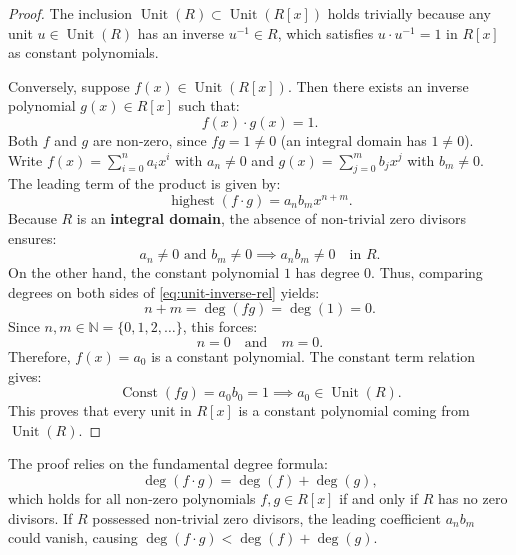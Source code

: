 \begin{content}

\begin{proof}
The inclusion $\operatorname{Unit}(R) \subset \operatorname{Unit}(R[x])$ holds trivially because any unit $u \in \operatorname{Unit}(R)$ has an inverse $u^{-1} \in R$, which satisfies $u \cdot u^{-1} = 1$ in $R[x]$ as constant polynomials.

Conversely, suppose $f(x) \in \operatorname{Unit}(R[x])$. Then there exists an inverse polynomial $g(x) \in R[x]$ such that:
\begin{equation}\label{eq:unit-inverse-rel}
f(x) \cdot g(x) = 1.
\end{equation}
Both $f$ and $g$ are non-zero, since $f g = 1 \neq 0$ (an integral domain has $1 \neq 0$). Write $f(x) = \sum_{i=0}^n a_i x^i$ with $a_n \neq 0$ and $g(x) = \sum_{j=0}^m b_j x^j$ with $b_m \neq 0$.
The leading term of the product is given by:
\[
\operatorname{highest}(f \cdot g) = a_n b_m x^{n+m}.
\]
Because $R$ is an \textbf{integral domain}, the absence of non-trivial zero divisors ensures:
\[
a_n \neq 0 \text{ and } b_m \neq 0 \implies a_n b_m \neq 0 \quad \text{in } R.
\]
On the other hand, the constant polynomial $1$ has degree $0$. Thus, comparing degrees on both sides of \eqref{eq:unit-inverse-rel} yields:
\[
n + m = \deg(fg) = \deg(1) = 0.
\]
Since $n, m \in \mathbb{N} = \{0, 1, 2, \dots\}$, this forces:
\[
n = 0 \quad \text{and} \quad m = 0.
\]
Therefore, $f(x) = a_0$ is a constant polynomial. The constant term relation gives:
\[
\operatorname{Const}(fg) = a_0 b_0 = 1 \implies a_0 \in \operatorname{Unit}(R).
\]
This proves that every unit in $R[x]$ is a constant polynomial coming from $\operatorname{Unit}(R)$.
\end{proof}

\begin{steps}
The proof relies on the fundamental degree formula:
\[
\deg(f \cdot g) = \deg(f) + \deg(g),
\]
which holds for all non-zero polynomials $f, g \in R[x]$ if and only if $R$ has no zero divisors. If $R$ possessed non-trivial zero divisors, the leading coefficient $a_n b_m$ could vanish, causing $\deg(f \cdot g) < \deg(f) + \deg(g)$.
\end{steps}
\end{content}

